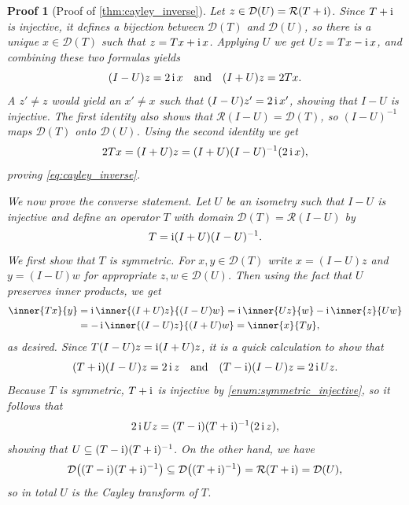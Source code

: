 \documentclass[article, a4paper, 11pt, oneside]{memoir}
\numberwithin{equation}{chapter}
\newcommand{\dom}{\mathcal{D}}
\newcommand{\range}{\mathcal{R}}
\theoremstyle{myexample}
\theoremstyle{myexample}
\theoremstyle{myexamplebreak}
\theoremstyle{myexamplebreak}
\theoremstyle{nonumberplain}
\theoremstyle{MyNonumberplain}
\newtheorem{proofof}{Proof}
\begin{document}
\begin{proofof}[Proof of \cref{thm:cayley_inverse}]
    Let $z \in \dom(U) = \range(T + \iu)$. Since $T + \operatorname{i}$ is injective, it defines a bijection between $\dom(T)$ and $\dom(U)$, so there is a unique $x \in \dom(T)$ such that $z = Tx + \operatorname{i} x$. Applying $U$ we get $Uz = Tx - \operatorname{i} x$, and combining these two formulas yields
    \begin{equation*}
        (I - U)z = 2 \operatorname{i} x
        \quad \text{and} \quad
        (I + U)z = 2Tx.
    \end{equation*}
    A $z' \neq z$ would yield an $x' \neq x$ such that $(I - U)z' = 2 \operatorname{i} x'$, showing that $I - U$ is injective. The first identity also shows that $\range(I - U) = \dom(T)$, so $(I - U)^{-1}$ maps $\dom(T)$ onto $\dom(U)$. Using the second identity we get
    \begin{equation*}
        2Tx
            = (I + U)z
            = (I + U)(I - U)^{-1}(2 \operatorname{i} x),
    \end{equation*}
    proving \eqref{eq:cayley_inverse}.
    
    We now prove the converse statement. Let $U$ be an isometry such that $I - U$ is injective and define an operator $T$ with domain $\dom(T) = \range(I - U)$ by
    \begin{equation*}
        T = \operatorname{i} (I + U) (I - U)^{-1}.
    \end{equation*}
    We first show that $T$ is symmetric. For $x,y \in \dom(T)$ write $x = (I - U)z$ and $y = (I - U)w$ for appropriate $z,w \in \dom(U)$. Then using the fact that $U$ preserves inner products, we get
    \begin{align*}
        \inner{Tx}{y}
            &= \iu \inner{(I + U)z}{(I - U)w}
             = \iu \inner{Uz}{w} - \iu \inner{z}{Uw} \\
            &= -\iu \inner{(I - U)z}{(I + U)w}
             = \inner{x}{Ty},
    \end{align*}
    as desired. Since $T(I - U)z = \operatorname{i} (I + U)z$, it is a quick calculation to show that
    \begin{equation*}
        (T + \operatorname{i})(I - U)z = 2 \operatorname{i} z
        \quad \text{and} \quad
        (T - \operatorname{i})(I - U)z = 2 \operatorname{i} Uz.
    \end{equation*}
    Because $T$ is symmetric, $T + \operatorname{i}$ is injective by \cref{enum:symmetric_injective}, so it follows that
    \begin{equation*}
        2 \operatorname{i} Uz = (T - \operatorname{i}) (T + \operatorname{i})^{-1} (2 \operatorname{i} z),
    \end{equation*}
    showing that $U \subseteq (T - \operatorname{i}) (T + \operatorname{i})^{-1}$. On the other hand, we have
    \begin{equation*}
        \dom \big( (T - \iu) (T + \iu)^{-1} \big)
            \subseteq \dom \big( (T + \iu)^{-1} \big)
            = \range(T + \iu)
            = \dom(U),
    \end{equation*}
    so in total $U$ is the Cayley transform of $T$.
\end{proofof}
\end{document}
